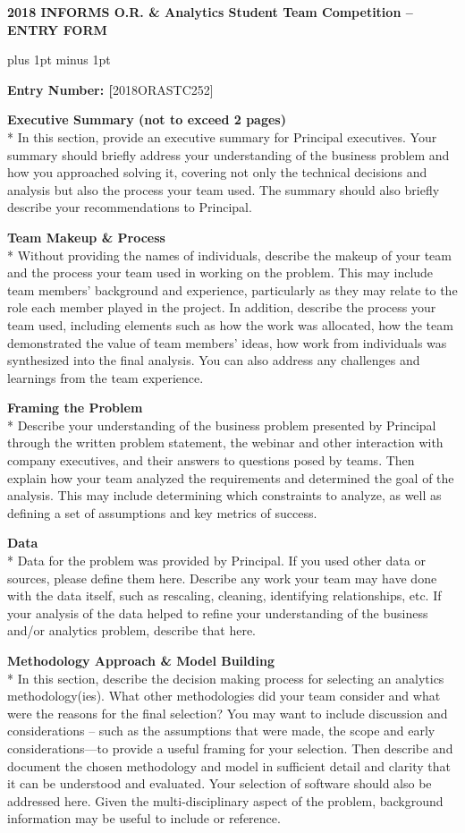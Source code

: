 \documentclass[11pt]{article}
\begin{document}
\centerline{\textbf{2018 INFORMS O.R. {\&} Analytics Student Team Competition -- ENTRY FORM}}

\baselineskip16pt plus 1pt minus 1pt


\textbf{Entry Number: [}2018ORASTC252]

\textbf{Executive Summary (not to exceed 2 pages)}\\*
In this section, provide an executive summary for Principal executives. Your 
summary should briefly address your understanding of the business problem 
and how you approached solving it, covering not only the technical decisions 
and analysis but also the process your team used. The summary should also 
briefly describe your recommendations to Principal.

\textbf{Team Makeup {\&} Process}\\*
Without providing the names of individuals, describe the makeup of your team 
and the process your team used in working on the problem. This may include 
team members' background and experience, particularly as they may relate to 
the role each member played in the project. In addition, describe the 
process your team used, including elements such as how the work was 
allocated, how the team demonstrated the value of team members' ideas, how 
work from individuals was synthesized into the final analysis. You can also 
address any challenges and learnings from the team experience. 

\textbf{Framing the Problem}\\*
Describe your understanding of the business problem presented by Principal 
through the written problem statement, the webinar and other interaction 
with company executives, and their answers to questions posed by teams. Then 
explain how your team analyzed the requirements and determined the goal of 
the analysis. This may include determining which constraints to analyze, as 
well as defining a set of assumptions and key metrics of success.

\textbf{Data}\\*
Data for the problem was provided by Principal. If you used other data or 
sources, please define them here. Describe any work your team may have done 
with the data itself, such as rescaling, cleaning, identifying 
relationships, etc. If your analysis of the data helped to refine your 
understanding of the business and/or analytics problem, describe that here.

\textbf{Methodology Approach {\&} Model Building}\\*
In this section, describe the decision making process for selecting an 
analytics methodology(ies). What other methodologies did your team consider 
and what were the reasons for the final selection? You may want to include 
discussion and considerations -- such as the assumptions that were made, the 
scope and early considerations---to provide a useful framing for your 
selection. Then describe and document the chosen methodology and model in 
sufficient detail and clarity that it can be understood and evaluated. Your 
selection of software should also be addressed here. Given the 
multi-disciplinary aspect of the problem, background information may be 
useful to include or reference. 
\end{document}
